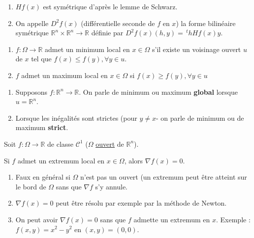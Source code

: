 \documentclass[a4paper,11pt]{article}
\newcommand{\R}{\mathbb{R}}
\newcommand{\tpo}[1]{\,^t#1}
\theoremstyle{plain} %
\begin{document}
\begin{remark}
    \begin{enumerate}[label=-]
        \item $Hf(x)$ est symétrique d'après le lemme de Schwarz.
        \item On appelle $D^2f(x)$ (différentielle seconde de $f$ en $x$) la forme
            bilinéaire symétrique $\R^n \times \R^n \longrightarrow \R$ définie par
            $D^2f(x) (h,y) = \tpo{h} Hf(x) y$.
    \end{enumerate}
\end{remark}

\begin{fdef}
    \begin{enumerate}[label=-]
        \item $f : \Omega \longrightarrow \R$ admet un minimum local en $x \in \Omega$ s'il existe
            un voisinage ouvert $u$ de $x$ tel que $f(x) \leq f(y), \forall y \in u$.

        \item $f$ admet un maximum local en $x \in \Omega$ si $f(x) \geq f(y), \forall y \in u$
    \end{enumerate}
\end{fdef}

\begin{remark}
    \begin{enumerate}[label=•]
        \item Supposons $f : \R^n \longrightarrow \R$. On parle de minimum ou maximum
            \textbf{global} lorsque $u = \R^n$.

        \item Lorsque les inégalités sont strictes (pour $y \ne x$- on parle de minimum
            ou de maximum \textbf{strict}.
    \end{enumerate}
\end{remark}

\begin{lemme}
    Soit $f : \Omega \longrightarrow \R$ de classe $\mathcal{C}^1$ ($\Omega$ \underline{ouvert} de $\R^n$). 
    
    Si $f$ admet un extremum local en $x \in \Omega$, alors $\nabla f(x) = 0$.
\end{lemme}

\begin{remark}
    \begin{enumerate}[label=-]
        \item Faux en général si $\Omega$ n'est pas un ouvert (un extremum peut être atteint
            sur le bord de $\Omega$ sans que $\nabla f$ s'y annule.

        \item $\nabla f(x) = 0$ peut être résolu par exemple par la méthode de Newton.

        \item On peut avoir $\nabla f(x) = 0$ sans que $f$ admette un extremum en $x$.
            Exemple : $f(x,y) = x^2 - y^2$ en $(x,y)= (0,0)$.
    \end{enumerate}
\end{remark}
\end{document}
